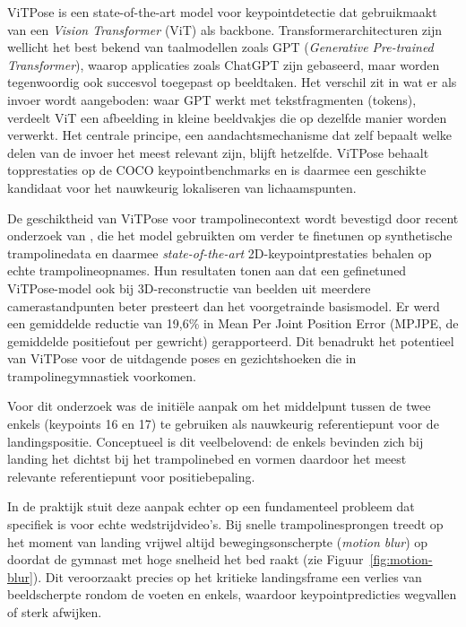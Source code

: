 ViTPose \autocite{Xu2022} is een state-of-the-art model voor keypointdetectie dat gebruikmaakt van een \textit{Vision Transformer} (ViT) als backbone. Transformerarchitecturen zijn wellicht het best bekend van taalmodellen zoals GPT (\textit{Generative Pre-trained Transformer}), waarop applicaties zoals ChatGPT zijn gebaseerd, maar worden tegenwoordig ook succesvol toegepast op beeldtaken. Het verschil zit in wat er als invoer wordt aangeboden: waar GPT werkt met tekstfragmenten (tokens), verdeelt ViT een afbeelding in kleine beeldvakjes die op dezelfde manier worden verwerkt. Het centrale principe, een aandachtsmechanisme dat zelf bepaalt welke delen van de invoer het meest relevant zijn, blijft hetzelfde. ViTPose behaalt topprestaties op de COCO keypointbenchmarks en is daarmee een geschikte kandidaat voor het nauwkeurig lokaliseren van lichaamspunten.


De geschiktheid van ViTPose voor trampolinecontext wordt bevestigd door recent onderzoek van \textcite{DroletRoy2026}, die het model gebruikten om verder te finetunen op synthetische trampolinedata en daarmee \textit{state-of-the-art} 2D-keypointprestaties behalen op echte trampolineopnames. Hun resultaten tonen aan dat een gefinetuned ViTPose-model ook bij 3D-reconstructie van beelden uit meerdere camerastandpunten beter presteert dan het voorgetrainde basismodel. Er werd een gemiddelde reductie van 19,6\% in Mean Per Joint Position Error (MPJPE, de gemiddelde positiefout per gewricht) gerapporteerd. Dit benadrukt het potentieel van ViTPose voor de uitdagende poses en gezichtshoeken die in trampolinegymnastiek voorkomen.

Voor dit onderzoek was de initiële aanpak om het middelpunt tussen de twee enkels (keypoints 16 en 17) te gebruiken als nauwkeurig referentiepunt voor de landingspositie. Conceptueel is dit veelbelovend: de enkels bevinden zich bij landing het dichtst bij het trampolinebed en vormen daardoor het meest relevante referentiepunt voor positiebepaling.

In de praktijk stuit deze aanpak echter op een fundamenteel probleem dat specifiek is voor echte wedstrijdvideo's. Bij snelle trampolinesprongen treedt op het moment van landing vrijwel altijd bewegingsonscherpte (\textit{motion blur}) op doordat de gymnast met hoge snelheid het bed raakt (zie Figuur~\ref{fig:motion-blur}). Dit veroorzaakt precies op het kritieke landingsframe een verlies van beeldscherpte rondom de voeten en enkels, waardoor keypointpredicties wegvallen of sterk afwijken.


